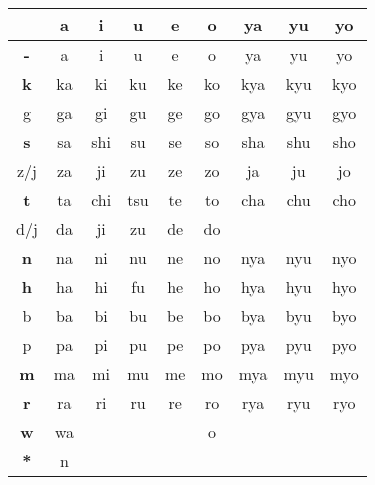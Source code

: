 
\LARGE

\begin{center}

\begin{tabular}{c||c|c|c|c|c||c|c|c|}
& \textbf{\large a}& \textbf{\large i}& \textbf{\large u}& \textbf{\large e}& \textbf{\large o}&
\textbf{\small ya}& \textbf{\small yu}& \textbf{\small yo}\\ \hline \hline 

\textbf{\large -}  & a &  i&    u&  e&  o&  ya&  yu&  yo\\ \hline 
\textbf{\large k}  & ka&  ki&  ku& ke& ko& kya& kyu& kyo\\
{\small g}         & ga&  gi&  gu& ge& go& gya& gyu& gyo\\ \hline 
\textbf{\large s}  & sa& shi&  su& se& so& sha& shu& sho\\
{\small z/j}       & za&  ji&  zu& ze& zo&  ja&  ju&  jo\\ \hline 
\textbf{\large t}  & ta& chi& tsu& te& to& cha& chu& cho\\
{\small d/j}       & da&  ji&  zu& de& do&    &    &    \\ \hline 
\textbf{\large n}  & na&  ni&  nu& ne& no& nya& nyu& nyo\\ \hline 
\textbf{\large h}  & ha&  hi&  fu& he& ho& hya& hyu& hyo\\
{\small b}         & ba&  bi&  bu& be& bo& bya& byu& byo\\
{\small p}         & pa&  pi&  pu& pe& po& pya& pyu& pyo\\ \hline 
\textbf{\large m}  & ma&  mi&  mu& me& mo& mya& myu& myo\\ \hline 
\textbf{\large r}  & ra&  ri&  ru& re& ro& rya& ryu& ryo\\ \hline 
\textbf{\large w}  & wa&    &    &   &  o&    &    &    \\ \hline 
\textbf{\large {*}}&  n&    &    &   &   &    &    &    \\ \hline 
\end{tabular}
\end{center}
